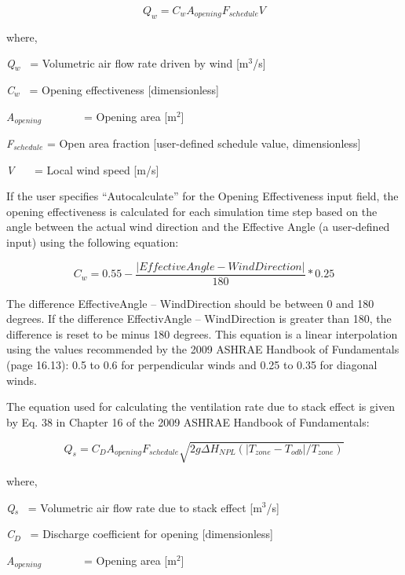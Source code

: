 \begin{equation}
{Q_w} = {C_w}{A_{opening}}{F_{schedule}}V
\end{equation}

where,

\emph{Q\(_{w}\)}~ = Volumetric air flow rate driven by wind {[}m\(^{3}\)/s{]}

\emph{C\(_{w}\)}~ = Opening effectiveness {[}dimensionless{]}

\emph{A\(_{opening}\)}~~~~~~~ = Opening area {[}m\(^{2}\){]}

\emph{F\(_{schedule}\)} = Open area fraction {[}user-defined schedule value, dimensionless{]}

\emph{V}~~~ = Local wind speed {[}m/s{]}

If the user specifies ``Autocalculate'' for the Opening Effectiveness input field, the opening effectiveness is calculated for each simulation time step based on the angle between the actual wind direction and the Effective Angle (a user-defined input) using the following equation:

\begin{equation}
{C_w} = 0.55 - \frac{{\left| {EffectiveAngle - WindDirection} \right|}}{{180}}*0.25
\end{equation}

The difference \textbar{}EffectiveAngle -- WindDirection\textbar{} should be between 0 and 180 degrees. If the difference \textbar{}EffectivAngle -- WindDirection\textbar{} is greater than 180, the difference is reset to be minus 180 degrees. This equation is a linear interpolation using the values recommended by the 2009 ASHRAE Handbook of Fundamentals (page 16.13): 0.5 to 0.6 for perpendicular winds and 0.25 to 0.35 for diagonal winds.

The equation used for calculating the ventilation rate due to stack effect is given by Eq. 38 in Chapter 16 of the 2009 ASHRAE Handbook of Fundamentals:

\begin{equation}
{Q_s} = {C_D}{A_{opening}}{F_{schedule}}\sqrt {2g\Delta {H_{NPL}}(|{T_{zone}} - {T_{odb}}|/{T_{zone}})}
\end{equation}

where,

\emph{Q\(_{s}\)}~ = Volumetric air flow rate due to stack effect {[}m\(^{3}\)/s{]}

\emph{C\(_{D}\)}~ = Discharge coefficient for opening {[}dimensionless{]}

\emph{A\(_{opening}\)}~~~~~~~ = Opening area {[}m\(^{2}\){]}

